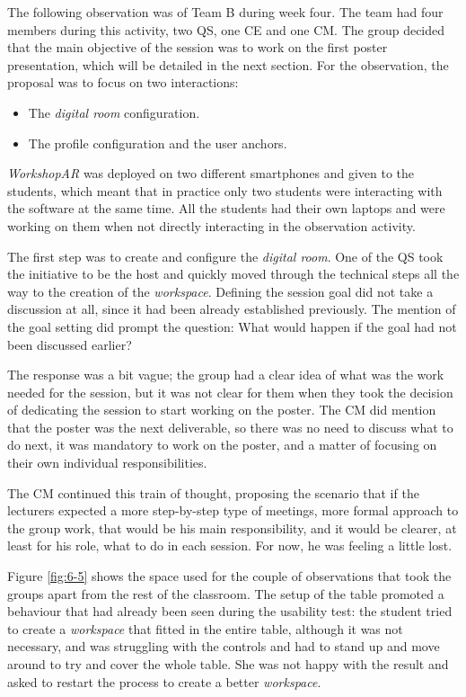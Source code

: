 The following observation was of Team B during week four. The team had four members during this activity, two \ac{QS}, one \ac{CE} and one \ac{CM}. The group decided that
the main objective of the session was to work on the first poster presentation, which will be detailed in the next section. For the observation, the proposal was to focus
on two interactions:

\begin{itemize}
    \item The \emph{digital room} configuration.
    \item The profile configuration and the user anchors.
\end{itemize}

\emph{WorkshopAR} was deployed on two different smartphones and given to the students, which meant that in practice only two students were interacting with the software at
the same time. All the students had their own laptops and were working on them when not directly interacting in the observation activity.

The first step was to create and configure the \emph{digital room}. One of the \ac{QS} took the initiative to be the host and quickly moved through the technical steps all
the way to the creation of the \emph{workspace}. Defining the session goal did not take a discussion at all, since it had been already established previously. The mention
of the goal setting did prompt the question: What would happen if the goal had not been discussed earlier?

The response was a bit vague; the group had a clear idea of what was the work needed for the session, but it was not clear for them when they took the decision of
dedicating the session to start working on the poster. The \ac{CM} did mention that the poster was the next deliverable, so there was no need to discuss what to do next,
it was mandatory to work on the poster, and a matter of focusing on their own individual responsibilities.

The \ac{CM} continued this train of thought, proposing the scenario that if the lecturers expected a more step-by-step type of meetings, more formal approach to the group
work, that would be his main responsibility, and it would be clearer, at least for his role, what to do in each session. For now, he was feeling a little lost.

Figure \ref{fig:6-5} shows the space used for the couple of observations that took the groups apart from the rest of the classroom. The setup of the table promoted a
behaviour that had already been seen during the usability test: the student tried to create a \emph{workspace} that fitted in the entire table, although it was not necessary, and
was struggling with the controls and had to stand up and move around to try and cover the whole table. She was not happy with the result and asked to restart the process
to create a better \emph{workspace}.

